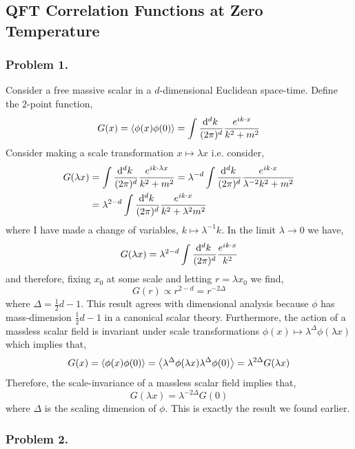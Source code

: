 \documentclass[12pt]{article}
\begin{document}
\subsection{QFT Correlation Functions at Zero Temperature}

\subsubsection{Problem 1.}

Consider a free massive scalar in a $d$-dimensional Euclidean space-time. Define the $2$-point function,
\[ G(x) = \left< \phi(x) \phi(0) \right> = \int \frac{\mathrm{d}^{d} k \:}{(2\pi)^d} \frac{e^{i k \cdot x}}{k^2 + m^2} \]
Consider making a scale transformation $x \mapsto \lambda x$ i.e. consider,
\begin{align*}
G(\lambda x) & =  \int \frac{\mathrm{d}^{d} k \:}{(2\pi)^d} \frac{e^{i k \cdot \lambda x}}{k^2 + m^2} = \lambda^{-d} \int \frac{\mathrm{d}^{d} k \:}{(2 \pi)^d} \frac{e^{i k \cdot x}}{\lambda^{-2} k^2 + m^2}
\\
& = \lambda^{2 - d}  \int \frac{\mathrm{d}^{d} k \:}{(2 \pi)^d} \frac{e^{i k \cdot x}}{k^2 + \lambda^2 m^2}
\end{align*}
where I have made a change of variables, $k \mapsto \lambda^{-1} k$. In the limit $\lambda \to 0$ we have,
\[ G(\lambda x) = \lambda^{2 - d}  \int \frac{\mathrm{d}^{d} k \:}{(2 \pi)^d} \frac{e^{i k \cdot x}}{k^2} \]
and therefore, fixing $x_0$ at some scale and letting $r = \lambda x_0$ we find,
\[ G(r) \propto r^{2 - d} = r^{-2 \Delta} \]
where $\Delta = \tfrac{1}{2}d - 1$. This result agrees with dimensional analysis because $\phi$ has mass-dimension $\tfrac{1}{2} d - 1$ in a canonical scalar theory. Furthermore, the action of a massless scalar field is invariant under scale transformations $\phi(x) \mapsto \lambda^\Delta \phi(\lambda x)$ which implies that,
\[ G(x) = \left< \phi(x) \phi(0) \right> = \left< \lambda^\Delta \phi(\lambda x) \lambda^\Delta \phi(0) \right> = \lambda^{2 \Delta} G(\lambda x) \]
Therefore, the scale-invariance of a massless scalar field implies that,
\[ G(\lambda x) = \lambda^{-2 \Delta} G(0) \]
where $\Delta$ is the scaling dimension of $\phi$. This is exactly the result we found earlier. 

\subsubsection{Problem 2.}
\end{document}
